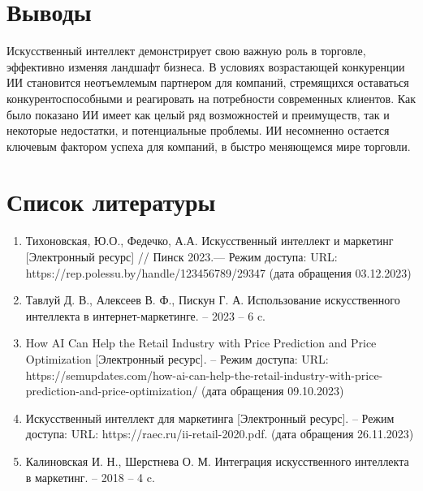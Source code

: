 \documentclass{article}
\begin{document}
\section*{\hspace{10mm}Выводы}
\normalsize{\hspace{5mm}Искусственный интеллект демонстрирует свою важную роль в торговле, эффективно изменяя ландшафт бизнеса. В условиях возрастающей конкуренции ИИ становится неотъемлемым партнером для компаний, стремящихся оставаться конкурентоспособными и реагировать на потребности современных клиентов. Как было показано ИИ имеет как целый ряд возможностей и преимуществ, так и некоторые недостатки, и потенциальные проблемы.  ИИ несомненно остается ключевым фактором успеха для компаний, в быстро меняющемся мире торговли.}

\section*{\hspace{10mm}Список литературы}

\begin{enumerate}
\item Тихоновская, Ю.О., Федечко, А.А. Искусственный интеллект и маркетинг [Электронный ресурс] // Пинск 2023.— Режим доступа: URL: https://rep.polessu.by/handle/123456789/29347 (дата обращения 03.12.2023)
\item Тавлуй Д. В., Алексеев В. Ф., Пискун Г. А. Использование искусственного интеллекта в интернет-маркетинге. – 2023 – 6 c.
\item How AI Can Help the Retail Industry with Price Prediction and Price Optimization [Электронный ресурс]. – Режим доступа: URL: https://semupdates.com/how-ai-can-help-the-retail-industry-with-price-prediction-and-price-optimization/ (дата обращения 09.10.2023)
\item Искусственный интеллект для маркетинга [Электронный ресурс]. – Режим доступа: URL: https://raec.ru/ii-retail-2020.pdf. (дата обращения 26.11.2023)
\item Калиновская И. Н., Шерстнева О. М. Интеграция искусственного интеллекта в маркетинг. – 2018 – 4 c.
\end{enumerate}
\end{document}
